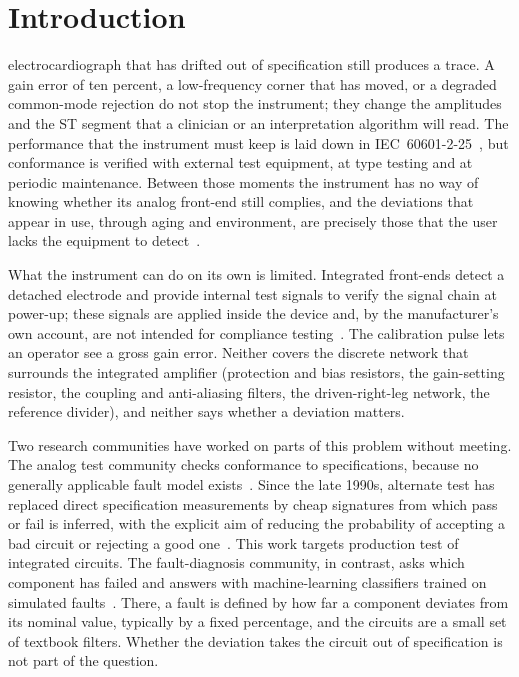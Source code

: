 \section{Introduction}
 electrocardiograph that has drifted out of specification still produces a
trace. A gain error of ten percent, a low-frequency corner that has moved, or a degraded
common-mode rejection do not stop the instrument; they change the amplitudes and the ST segment
that a clinician or an interpretation algorithm will read. The performance that the instrument
must keep is laid down in IEC~60601-2-25~\cite{iec60601225}, but conformance is verified with
external test equipment, at type testing and at periodic maintenance. Between those moments the
instrument has no way of knowing whether its analog front-end still complies, and the deviations
that appear in use, through aging and environment, are precisely those that the user lacks the
equipment to detect~\cite{chen2025}.

What the instrument can do on its own is limited. Integrated front-ends detect a detached
electrode and provide internal test signals to verify the signal chain at power-up; these signals
are applied inside the device and, by the manufacturer's own account, are not intended for
compliance testing~\cite{ads1298}. The calibration pulse lets an operator see a gross gain error.
Neither covers the discrete
network that surrounds the integrated amplifier (protection and bias resistors, the gain-setting
resistor, the coupling and anti-aliasing filters, the driven-right-leg network, the reference
divider), and neither says whether a deviation matters.

Two research communities have worked on parts of this problem without meeting. The analog test
community checks conformance to specifications, because no generally applicable fault model
exists~\cite{cheng2010}. Since the late 1990s, alternate test has replaced direct specification
measurements by cheap signatures from which pass or fail is inferred, with the explicit aim of
reducing the probability of accepting a bad circuit or rejecting a good
one~\cite{cheng2010,variyam1998spec,variyam1998synth,voorakaranam2007}. This work targets
production test of integrated circuits. The fault-diagnosis community, in contrast, asks which
component has failed and answers with machine-learning classifiers trained on simulated
faults~\cite{dieste2021,dieste2024,dieste2025,yang2020,rajpal2026}. There, a fault is defined by
how far a component deviates from its nominal value, typically by a fixed percentage, and the
circuits are a small set of textbook filters. Whether the deviation takes the circuit out of
specification is not part of the question.

